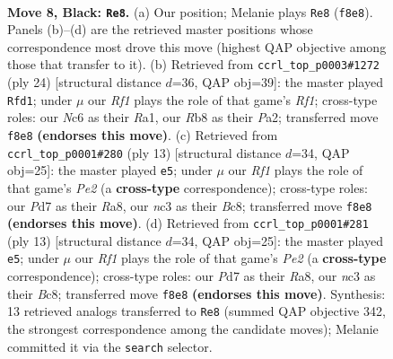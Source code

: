 \documentclass[11pt]{article}
\begin{document}
\begin{figure}[p]\centering
\begin{subfigure}{0.46\textwidth}\centering
\resizebox{\linewidth}{!}{%
\newchessgame
\chessboard[
  setfen={1rbq1rk1/pp1pppbp/2n2np1/2p5/2P1P2P/2N2NP1/PP1P1PB1/R1BQ1RK1 b - - 0 8},
  showmover=false,
  pgfstyle=straightmove, color=movearrow, markmove={f8-e8}
]}
\caption{}
\end{subfigure}\hfill
\begin{subfigure}{0.46\textwidth}\centering
\resizebox{\linewidth}{!}{%
\newchessgame
\chessboard[
  setfen={r2q1rk1/pp1b1pbp/2n1pnp1/3p4/3P1B2/2N2NP1/PP1QPPBP/R4RK1 w - - 8 13},
  showmover=false,
  pgfstyle=straightmove, color=movearrow, markmove={f1-d1}
]}
\caption{}
\end{subfigure}
\\[4pt]
\begin{subfigure}{0.46\textwidth}\centering
\resizebox{\linewidth}{!}{%
\newchessgame
\chessboard[
  setfen={r1bq1rk1/ppp1ppbp/2np1np1/8/2PP4/2N2NP1/PP2PPBP/R1BQ1RK1 b - - 3 7},
  showmover=false,
  pgfstyle=straightmove, color=movearrow, markmove={e7-e5}
]}
\caption{}
\end{subfigure}\hfill
\begin{subfigure}{0.46\textwidth}\centering
\resizebox{\linewidth}{!}{%
\newchessgame
\chessboard[
  setfen={r1bq1rk1/ppp1ppbp/2np1np1/8/2PP4/2N2NP1/PP2PPBP/R1BQ1RK1 b - - 3 7},
  showmover=false,
  pgfstyle=straightmove, color=movearrow, markmove={e7-e5}
]}
\caption{}
\end{subfigure}
\caption{\textbf{Move 8, Black: \texttt{Re8}.} (a) Our position; Melanie plays \texttt{Re8} (\texttt{f8e8}). Panels (b)--(d) are the retrieved master positions whose correspondence most drove this move (highest QAP objective among those that transfer to it). (b) Retrieved from \texttt{ccrl\_top\_p0003\#1272} (ply 24) [structural distance $d$=36, QAP obj=39]: the master played \texttt{Rfd1}; under $\mu$ our \emph{Rf1} plays the role of that game's \emph{Rf1}; cross-type roles: our \emph{N}c6 as their \emph{R}a1, our \emph{R}b8 as their \emph{P}a2; transferred move \texttt{f8e8} \textbf{(endorses this move)}. (c) Retrieved from \texttt{ccrl\_top\_p0001\#280} (ply 13) [structural distance $d$=34, QAP obj=25]: the master played \texttt{e5}; under $\mu$ our \emph{Rf1} plays the role of that game's \emph{Pe2} (a \textbf{cross-type} correspondence); cross-type roles: our \emph{P}d7 as their \emph{R}a8, our \emph{n}c3 as their \emph{B}c8; transferred move \texttt{f8e8} \textbf{(endorses this move)}. (d) Retrieved from \texttt{ccrl\_top\_p0001\#281} (ply 13) [structural distance $d$=34, QAP obj=25]: the master played \texttt{e5}; under $\mu$ our \emph{Rf1} plays the role of that game's \emph{Pe2} (a \textbf{cross-type} correspondence); cross-type roles: our \emph{P}d7 as their \emph{R}a8, our \emph{n}c3 as their \emph{B}c8; transferred move \texttt{f8e8} \textbf{(endorses this move)}. Synthesis: 13 retrieved analogs transferred to \texttt{Re8} (summed QAP objective 342, the strongest correspondence among the candidate moves); Melanie committed it via the \texttt{search} selector.}
\label{fig:thought-m15}
\end{figure}
\end{document}
